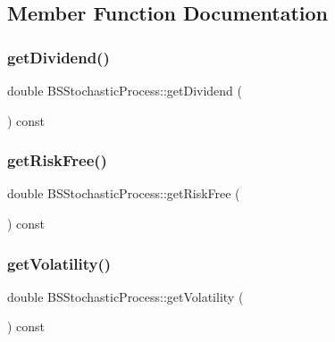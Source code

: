 \subsection{Member Function Documentation}
\hypertarget{class_b_s_stochastic_process_a42caffac3e61f92af6849b86df0d9b6b}{}\label{class_b_s_stochastic_process_a42caffac3e61f92af6849b86df0d9b6b} 
\subsubsection{\texorpdfstring{get\+Dividend()}{getDividend()}}
{\footnotesize\ttfamily double B\+S\+Stochastic\+Process\+::get\+Dividend (\begin{DoxyParamCaption}{ }\end{DoxyParamCaption}) const}

\hypertarget{class_b_s_stochastic_process_a9cd46cb3dceb0aee302bf3a6c2ea39a1}{}\label{class_b_s_stochastic_process_a9cd46cb3dceb0aee302bf3a6c2ea39a1} 
\subsubsection{\texorpdfstring{get\+Risk\+Free()}{getRiskFree()}}
{\footnotesize\ttfamily double B\+S\+Stochastic\+Process\+::get\+Risk\+Free (\begin{DoxyParamCaption}{ }\end{DoxyParamCaption}) const}

\hypertarget{class_b_s_stochastic_process_ab63f363e94441ed0ee22ef10beea16a6}{}\label{class_b_s_stochastic_process_ab63f363e94441ed0ee22ef10beea16a6} 
\subsubsection{\texorpdfstring{get\+Volatility()}{getVolatility()}\hspace{0.1cm}{\footnotesize\ttfamily [1/2]}}
{\footnotesize\ttfamily double B\+S\+Stochastic\+Process\+::get\+Volatility (\begin{DoxyParamCaption}{ }\end{DoxyParamCaption}) const}

